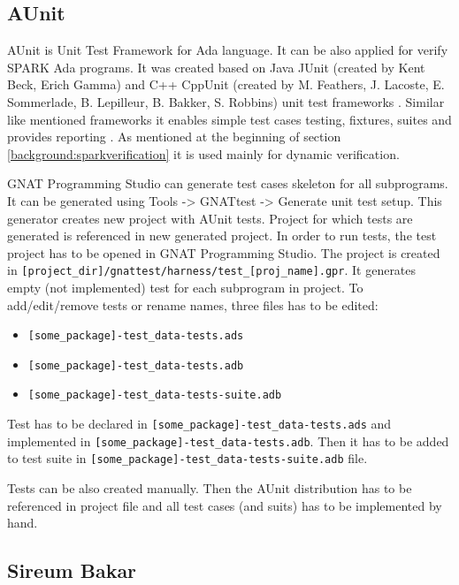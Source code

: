 \subsection{AUnit}
\label{background:spark:aunit}

AUnit is Unit Test Framework for Ada language. It can be also applied for verify SPARK Ada programs. It was created based on Java JUnit (created by Kent Beck, Erich Gamma) and C++ CppUnit (created by M. Feathers, J. Lacoste, E. Sommerlade, B. Lepilleur, B. Bakker, S. Robbins) unit test frameworks \cite{AUnitCookbook:Online}. Similar like mentioned frameworks it enables simple test cases testing, fixtures, suites and provides reporting \cite{AUnitTutorials:Online}. As mentioned at the beginning of section \ref{background:sparkverification} it is used mainly for dynamic verification.

GNAT Programming Studio can generate test cases skeleton for all subprograms. It can be generated using Tools -> GNATtest -> Generate unit test setup. This generator creates new project with AUnit tests. Project for which tests are generated is referenced in new generated project. In order to run tests, the test project has to be opened in GNAT Programming Studio. The project is created in \lstinline{[project_dir]/gnattest/harness/test_[proj_name].gpr}. It generates empty (not implemented) test for each subprogram in project. To add/edit/remove tests or rename names, three files has to be edited:

\begin{itemize}
    \item \lstinline{[some_package]-test_data-tests.ads}
    \item \lstinline{[some_package]-test_data-tests.adb}
    \item \lstinline{[some_package]-test_data-tests-suite.adb}
\end{itemize}

Test has to be declared in \lstinline{[some_package]-test_data-tests.ads} and implemented in \lstinline{[some_package]-test_data-tests.adb}. Then it has to be added to test suite in \lstinline{[some_package]-test_data-tests-suite.adb} file.

Tests can be also created manually. Then the AUnit distribution has to be referenced in project file and all test cases (and suits) has to be implemented by hand.



\subsection{Sireum Bakar}
\label{background:spark:sireum}

